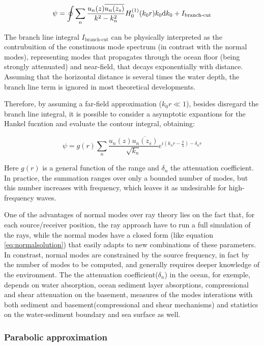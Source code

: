\begin{equation}
\psi = \oint \sum_n{\frac{u_n(z)\overline{u_n(z_s)}}{k^2 -
k_n^2}H_0^{(1)}(k_0r)k_0\mathrm{d} k_0} + I_{\text{branch-cut}}
\end{equation}

The branch line integral $I_{\text{branch-cut}}$ can be physically interpreted
as the contrubuition of the constinuous mode spectrum (in contrast with the
normal modes), representing modes that propagates through the ocean floor
(being strongly attenuated) and near-field, that decays exponentially with
distance. Assuming that the horizontal distance is several times the water
depth, the branch line term is ignored in most theoretical developments.

Therefore, by assuming a far-field approximation ($k_0r \ll 1$), besides
disregard the branch line integral, it is possible to consider a asymptotic expantions for the
Hankel fucntion and evaluate the contour integral, obtaining\cite{Etter2013}:

\begin{equation}
\label{eq:normalsolution}
\psi =
g(r)\sum_n{\frac{u_n(z)\overline{u_n(z_s)}}{\sqrt{k_n}}e^{i(k_nr-\tfrac{\pi}{4})-\delta_nr}}
\end{equation}

Here $g(r)$ is a general function of the range and $\delta_n$ the attenuation
coefficient. In practice, the summation ranges over only a bounded number of
modes, but this number increases with frequency, which leaves it as undesirable
for high-frequency waves. 

One of the advantages of normal modes over ray theory lies on the fact that, for
each source/receiver position, the ray approach have to run a full simulation of
the rays, while the normal modes have a closed form (like equation
\ref{eq:normalsolution}) that easily adapts to new combinations of these
parameters. In constrast, normal modes are constrained by the source frequency,
in fact by the number of modes to be computed, and generally requires deeper
knowledge of the environment. The the attenuation
coefficient($\delta_n$) in the ocean, for exemple, depends on water absorption,
ocean sediment layer absorptions, compressional and shear attenuation on the
basement, measures of the modes interations with both sediment and
basement(compressional and shear mechanisms) and statistics on the
water-sediment boundary and sea surface as well.

\subsubsection{Parabolic approximation}

